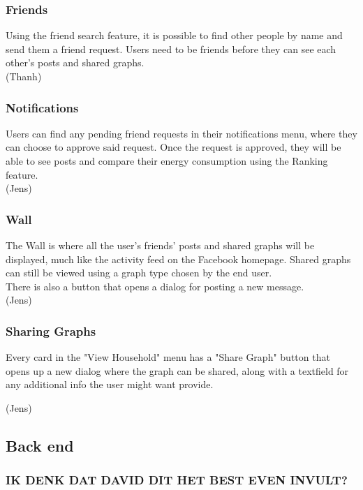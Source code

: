 \documentclass[11pt]{article}
\begin{document}
	\subsubsection{Friends}
		Using the friend search feature, it is possible to find other people by name and send them a friend request.
		Users need to be friends before they can see each other's posts and shared graphs.\\

		(Thanh)

	\subsubsection{Notifications}
		Users can find any pending friend requests in their notifications menu, where they can choose to approve said request.
		Once the request is approved, they will be able to see posts and compare their energy consumption using the Ranking feature.\\

		(Jens)

	\subsubsection{Wall}
		The Wall is where all the user's friends' posts and shared graphs will be displayed,
		much like the activity feed on the Facebook homepage.
		Shared graphs can still be viewed using a graph type chosen by the end user.\\

		There is also a button that opens a dialog for posting a new message.\\

		(Jens)

	\subsubsection{Sharing Graphs}
		Every card in the "View Household" menu has a "Share Graph" button that opens up a new dialog where the graph can be shared,
		along with a textfield for any additional info the user might want provide.

		(Jens)
		
  \subsection{Back end}
	\subsubsection{IK DENK DAT DAVID DIT HET BEST EVEN INVULT?}
\end{document}
